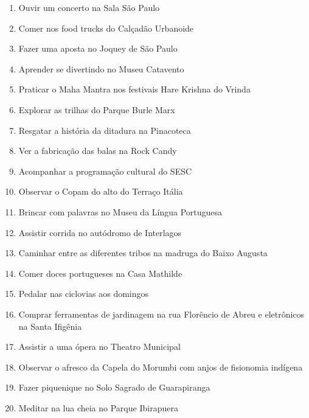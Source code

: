 \documentclass[extrafontsizes,14pt]{memoir}
\begin{document}
\begin{enumerate}
\item Ouvir um concerto na Sala São Paulo

\item Comer nos food trucks do Calçadão Urbanoide

\item Fazer uma aposta no Joquey de São Paulo

\item Aprender se divertindo no Museu Catavento
 
\item Praticar o Maha Mantra nos festivais Hare Krishna do Vrinda
 
\item Explorar as trilhas do Parque Burle Marx

\item Resgatar a história da ditadura na Pinacoteca

\item Ver a fabricação das balas na Rock Candy
 
\item Acompanhar a programação cultural do SESC
 
\item Observar o Copam do alto do Terraço Itália
 
\item Brincar com palavras no Museu da Língua Portuguesa

\item Assistir corrida no autódromo de Interlagos

\item Caminhar entre as diferentes tribos na madruga do Baixo Augusta

\item Comer doces portugueses na Casa Mathilde

\item Pedalar nas ciclovias aos domingos

\item Comprar ferramentas de jardinagem na rua    Florêncio de Abreu e eletrônicos na Santa Ifigênia

\item Assistir a uma ópera no Theatro Municipal

\item Observar o afresco da Capela do Morumbi com anjos de fisionomia indígena

\item Fazer piquenique no Solo Sagrado de Guarapiranga

\item Meditar na lua cheia no Parque Ibirapuera


\end{enumerate}
\end{document}
